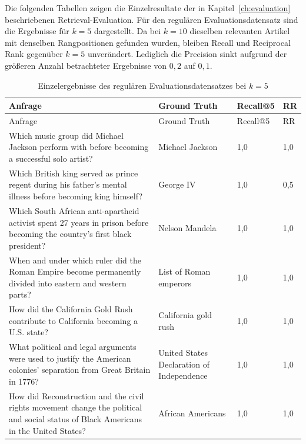 Die folgenden Tabellen zeigen die Einzelresultate der in
Kapitel~\ref{ch:evaluation} beschriebenen Retrieval-Evaluation. Für den
regulären Evaluationsdatensatz sind die Ergebnisse für $k=5$ dargestellt.
Da bei $k=10$ dieselben relevanten Artikel mit denselben Rangpositionen
gefunden wurden, bleiben Recall und Reciprocal Rank gegenüber $k=5$
unverändert. Lediglich die Precision sinkt aufgrund der größeren Anzahl
betrachteter Ergebnisse von $0{,}2$ auf $0{,}1$.
\small
\begin{longtable}{@{}>{\raggedright\arraybackslash}p{6.4cm}>{\raggedright\arraybackslash}p{3.6cm}p{1.5cm}p{1cm}@{}}
\caption{Einzelergebnisse des regulären Evaluationsdatensatzes bei $k=5$}
\label{tab:eval-einzel-regulaer}\\
\toprule
Anfrage & Ground Truth & Recall@5 & RR \\
\midrule
\endfirsthead

\toprule
Anfrage & Ground Truth & Recall@5 & RR \\
\midrule
\endhead

\bottomrule
\endfoot

Which music group did Michael Jackson perform with before becoming a successful solo artist?
& Michael Jackson & 1,0 & 1,0 \\

Which British king served as prince regent during his father's mental illness before becoming king himself?
& George IV & 1,0 & 0,5 \\

Which South African anti-apartheid activist spent 27 years in prison before becoming the country's first black president?
& Nelson Mandela & 1,0 & 1,0 \\

When and under which ruler did the Roman Empire become permanently divided into eastern and western parts?
& List of Roman emperors & 1,0 & 1,0 \\

How did the California Gold Rush contribute to California becoming a U.S. state?
& California gold rush & 1,0 & 1,0 \\

What political and legal arguments were used to justify the American colonies' separation from Great Britain in 1776?
& United States Declaration of Independence & 1,0 & 1,0 \\

How did Reconstruction and the civil rights movement change the political and social status of Black Americans in the United States?
& African Americans & 1,0 & 1,0 \\


\end{longtable}

